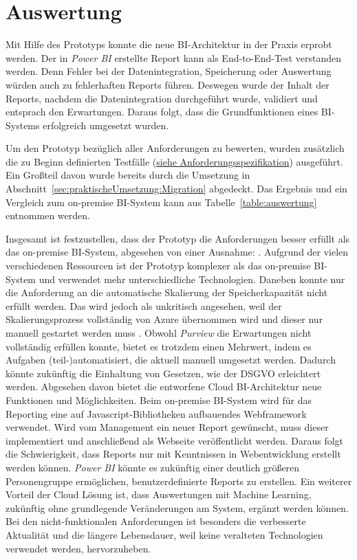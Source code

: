 \section{Auswertung} \label{sec:umsetzung:auswertung}
Mit Hilfe des Prototyps konnte die neue BI-Architektur in der Praxis erprobt werden. Der in \textit{Power BI} erstellte Report kann als End-to-End-Test verstanden werden. Denn Fehler bei der Datenintegration, Speicherung oder Auswertung würden auch zu fehlerhaften Reports führen. Deswegen wurde der Inhalt der Reports, nachdem die Datenintegration durchgeführt wurde, validiert und entsprach den Erwartungen. Daraus folgt, dass die Grundfunktionen eines BI-Systems erfolgreich umgesetzt wurden.

Um den Prototyp bezüglich aller Anforderungen zu bewerten, wurden zusätzlich die zu Beginn definierten Testfälle (\hyperref[sec:anforderungsspezifikation:funktionaleAnforderungen]{siehe Anforderungsspezifikation}) ausgeführt. Ein Großteil davon wurde bereits durch die Umsetzung in Abschnitt~\ref{sec:praktischeUmsetzung:Migration} abgedeckt. Das Ergebnis und ein Vergleich zum on-premise BI-System kann aus Tabelle~\ref{table:auswertung} entnommen werden. 



\hfill \break
\noindent Insgesamt ist festzustellen, dass der Prototyp die Anforderungen besser erfüllt als das on-premise BI-System, abgesehen von einer Ausnahme: \textit{}. Aufgrund der vielen verschiedenen Ressourcen ist der Prototyp komplexer als das on-premise BI-System und verwendet mehr unterschiedliche Technologien. Daneben konnte nur die Anforderung an die automatische Skalierung der Speicherkapazität nicht erfüllt werden. Das wird jedoch als unkritisch angesehen, weil der Skalierungsprozess vollständig von Azure übernommen wird und dieser nur manuell gestartet werden muss \cite{reagan_web_2018}. Obwohl \textit{Purview} die Erwartungen nicht vollständig erfüllen konnte, bietet es trotzdem einen Mehrwert, indem es Aufgaben (teil-)automatisiert, die aktuell manuell umgesetzt werden. Dadurch könnte zukünftig die Einhaltung von Gesetzen, wie der DSGVO erleichtert werden. Abgesehen davon bietet die entworfene Cloud BI-Architektur neue Funktionen und Möglichkeiten. Beim on-premise BI-System wird für das Reporting eine auf Javascript-Bibliotheken aufbauendes Webframework verwendet. Wird vom Management ein neuer Report gewünscht, muss dieser implementiert und anschließend als Webseite veröffentlicht werden. Daraus folgt die Schwierigkeit, dass Reports nur mit Kenntnissen in Webentwicklung erstellt werden können. \textit{Power BI} könnte es zukünftig einer deutlich größeren Personengruppe ermöglichen, benutzerdefinierte Reports zu erstellen. Ein weiterer Vorteil der Cloud Lösung ist, dass Auswertungen mit Machine Learning, zukünftig ohne grundlegende Veränderungen am System, ergänzt werden können. Bei den nicht-funktionalen Anforderungen ist besonders die verbesserte Aktualität und die längere Lebensdauer, weil keine veralteten Technologien verwendet werden, hervorzuheben.